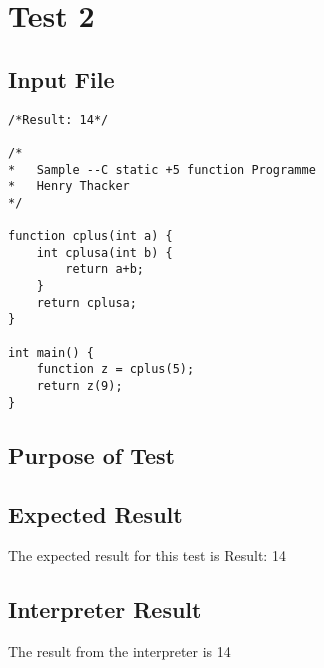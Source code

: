\section{Test 2}
\subsection{Input File}
\begin{verbatim}
/*Result: 14*/

/*
*	Sample --C static +5 function Programme
*	Henry Thacker
*/

function cplus(int a) { 
	int cplusa(int b) { 
		return a+b; 
	} 
	return cplusa;
}

int main() {
	function z = cplus(5);
	return z(9);
}\end{verbatim}\subsection{Purpose of Test}

\subsection{Expected Result}
The expected result for this test is Result: 14
\subsection{Interpreter Result}
The result from the interpreter is 14
